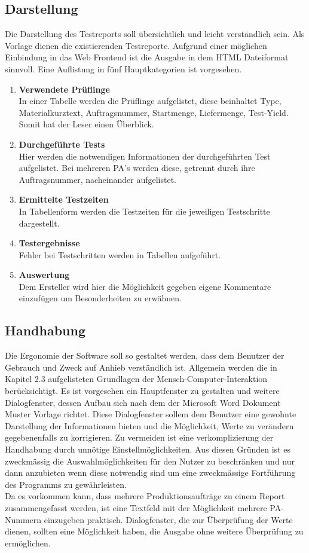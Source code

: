 \subsection{Darstellung}
Die Darstellung des Testreports soll übersichtlich und leicht verständlich sein. Als Vorlage dienen die existierenden Testreporte. Aufgrund einer möglichen Einbindung in das Web Frontend ist die Ausgabe in dem \ac{HTML} Dateiformat sinnvoll. Eine Auflistung in fünf Hauptkategorien ist vorgesehen.
\begin{enumerate}
\item \textbf{Verwendete Prüflinge} \\
In einer Tabelle werden die Prüflinge aufgelistet, diese beinhaltet Type, Materialkurztext, Auftragsnummer, Startmenge, Liefermenge, Test-Yield. Somit hat der Leser einen Überblick.
\item \textbf{Durchgeführte Tests} \\
Hier werden die notwendigen Informationen der durchgeführten Test aufgelistet. Bei mehreren \ac{PA}'s werden diese, getrennt durch ihre Auftragsnummer, nacheinander aufgelistet.
\item \textbf{Ermittelte Testzeiten} \\
In Tabellenform werden die Testzeiten für die jeweiligen Testschritte dargestellt.
\item \textbf{Testergebnisse} \\
Fehler bei Testschritten werden in Tabellen aufgeführt.
\item \textbf{Auswertung} \\
Dem Ersteller wird hier die Möglichkeit gegeben eigene Kommentare einzufügen um Besonderheiten zu erwähnen.
\end{enumerate}
\newpage
	
\subsection{Handhabung}
Die Ergonomie der Software soll so gestaltet werden, dass dem Benutzer der Gebrauch und Zweck auf Anhieb verständlich ist. Allgemein werden die in Kapitel 2.3 aufgelisteten Grundlagen der Mensch-Computer-Interaktion berücksichtigt. Es ist vorgesehen ein Hauptfenster zu gestalten und weitere Dialogfenster, dessen Aufbau sich nach dem der Microsoft Word Dokument Muster Vorlage richtet. Diese Dialogfenster sollem dem Benutzer eine gewohnte Darstellung der Informationen bieten und die Möglichkeit, Werte zu verändern gegebenenfalls zu korrigieren. Zu vermeiden ist eine verkomplizierung der Handhabung durch unnötige Einstellmöglichkeiten. Aus diesen Gründen ist es zweckmässig die Auswahlmöglichkeiten für den Nutzer zu beschränken und nur dann anzubieten wenn diese notwendig sind um eine zweckmässige Fortführung des Programms zu gewährleisten. \\
Da es vorkommen kann, dass mehrere Produktionsaufträge zu einem Report zusammengefasst werden, ist eine Textfeld mit der Möglichkeit mehrere \ac{PA}-Nummern einzugeben praktisch. Dialogfenster, die zur Überprüfung der Werte dienen, sollten eine Möglichkeit haben, die Ausgabe ohne weitere Überprüfung zu ermöglichen.